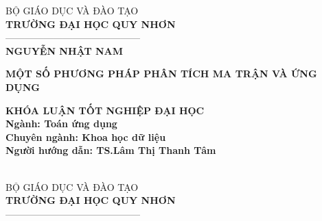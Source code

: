 \documentclass[12pt,a4paper,oneside]{report}
\numberwithin{equation}{section}
\begin{document}
\thispagestyle{empty}
\thisfancypage{\setlength{\fboxsep}{2pt}\setlength{\fboxrule}{2pt}\doublebox}{} 
\begin{center} %
{\fontsize{14pt}{16}\selectfont BỘ GIÁO DỤC VÀ ĐÀO TẠO}\\
\vskip 0.05cm
{\bf\fontsize{14pt}{16}\selectfont TRƯỜNG ĐẠI HỌC QUY NHƠN}\\
{——————————————}\\
\vskip 2cm
{\bf\fontsize{16pt}{22}\selectfont NGUYỄN NHẬT NAM}
\vskip 3cm
\begin{center}
{\bf\fontsize{22pt}{22}\selectfont MỘT SỐ PHƯƠNG PHÁP PHÂN TÍCH MA TRẬN VÀ ỨNG DỤNG}

\end{center}

\vskip 2.5cm
{\bf\fontsize{16pt}{22}\selectfont KHÓA LUẬN TỐT NGHIỆP ĐẠI HỌC}\\
\vskip 0.5cm
{\bf\fontsize{16pt}{22}\selectfont Ngành: Toán ứng dụng }\\
\vskip 0.05cm
{\bf\fontsize{16pt}{22}\selectfont Chuyên ngành: Khoa học dữ liệu}\\
\vskip 2.5cm
{\bf\fontsize{16pt}{22}\selectfont Người hướng dẫn: TS.Lâm Thị Thanh Tâm}\\

\vfill
{\bf\fontsize{14pt}{16}\selectfont {Bình Định, 2023}}\\
\end{center}
\newpage
\thispagestyle{empty}


\thisfancypage{\setlength{\fboxsep}{2pt}\setlength{\fboxrule}{2pt}\doublebox}{} 
\begin{center} %
{\fontsize{14pt}{16}\selectfont BỘ GIÁO DỤC VÀ ĐÀO TẠO}\\
\vskip 0.05cm
{\bf\fontsize{14pt}{16}\selectfont TRƯỜNG ĐẠI HỌC QUY NHƠN}\\
{——————————————}\\
\end{center}
\end{document}
